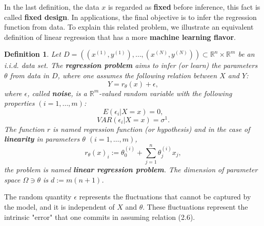 \documentclass{report}
\newtheorem{definition}{Definition}[chapter]
\begin{document}
In the last definition, the data $x$ is regarded as \textbf{fixed} before inference, this fact is called \textbf{fixed design}. In applications, the final objective is to infer the regression function from data. To explain this related problem, we illustrate an equivalent definition of linear regression that has a more \textbf{machine learning flavor}.

\begin{definition}
Let $D = ((x^{(1)},y^{(1)}),\dots,(x^{(N)},y^{(N)})) \subset \mathbb{R}^n \times \mathbb{R}^m$ be an i.i.d. data set. The \textbf{regression problem} aims to infer (or learn) the parameters $\theta$ from data in $D$, where one assumes the following relation between $X$ and $Y$:
\begin{equation}
Y = r_\theta(x) + \epsilon,
\end{equation}
where $\epsilon$, called \textbf{noise}, is a $\mathbb{R}^m$-valued random variable with the following properties $(i = 1,\dots,m)$:
\begin{equation}
E(\epsilon_i|X = x) = 0,
\end{equation}
\begin{equation}
VAR(\epsilon_i|X = x) = \sigma^1.
\end{equation}
The function $r$ is named regression function (or hypothesis) and in the case of \textbf{linearity} in parameters $\theta$ $(i = 1,\dots,m)$,
\begin{equation}
r_\theta(x)_i :=  \theta_0^{(i)} + \sum_{j=1}^{n}\theta^{(i)}_jx_j,
\end{equation}
the problem is named \textbf{linear regression problem}. The dimension of parameter space $\Omega \ni \theta$ is $d:= m(n+1)$.
\end{definition}

The random quantity $\epsilon$ represents the fluctuations that cannot be captured by the model, and it is independent of $X$ and $\theta$. These fluctuations represent the intrinsic "error" that one commits in assuming relation (2.6).
\end{document}
